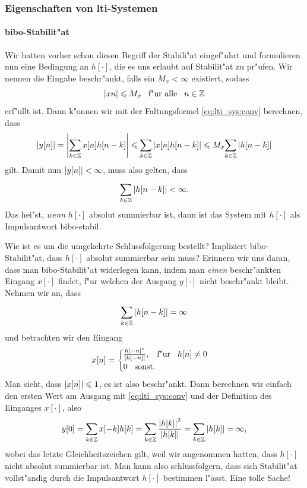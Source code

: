 \subsubsection{Eigenschaften von \texorpdfstring{\acrshort{lti}}{LTI}-Systemen}
%
\paragraph{\texorpdfstring{\gls{bibo}}{BIBO}-Stabilit"at}
Wir hatten vorher schon diesen Begriff der Stabili"at eingef"uhrt und formulieren nun eine Bedingung an $h[\cdot]$, die es uns erlaubt auf Stabilit"at zu pr"ufen.
Wir nennen die Eingabe beschr"ankt, falls ein $M_x < \infty$ existiert, sodass
\[
{\left| x{n} \right|} \leqslant M_x {\hspace{3mm} \text{f"ur alle} \hspace{3mm}} n \in \mathbb{Z}
\]
erf"ullt ist.
Dann k"onnen wir mit der Faltungsformel \eqref{eq:lti_sys:conv} berechnen, dass
\[
{\left| y[n] \right|} 
    = {\left| {\sum\limits_{k\in\mathbb{Z}}^{}{x[n] h[n-k]}} \right|} 
    \leqslant {\sum\limits_{k\in\mathbb{Z}}^{}{{\left| x[n] h[n-k] \right|}}} 
    \leqslant M_x {\sum\limits_{k\in\mathbb{Z}}^{}{{\left| h[n-k] \right|}}} 
\]
gilt.
Damit nun ${\left| y[n] \right|} < \infty$, muss also gelten, dass
\[
    {\sum\limits_{k\in\mathbb{Z}}^{}{{\left| h[n-k] \right|}}} < \infty.
\]
Das hei"st, \emph{wenn} $h[\cdot]$ absolut summierbar ist, dann ist das System mit $h[\cdot]$ als Impulsantwort \gls{bibo}-stabil.

Wie ist es um die umgekehrte Schlussfolgerung bestellt?
Impliziert \gls{bibo}-Stabilit"at, dass $h[\cdot]$ absolut summierbar sein muss?
Erinnern wir uns daran, dass man \gls{bibo}-Stabilit"at widerlegen kann, indem man \emph{einen} beschr"ankten Eingang $x[\cdot]$ findet, f"ur welchen der Ausgang $y[\cdot]$ nicht beschr"ankt bleibt.
Nehmen wir an, dass 
\[
{\sum\limits_{k\in\mathbb{Z}}^{}{{\left| h[n-k] \right|}}} = \infty
\]
und betrachten wir den Eingang
\[
x[n] = \begin{cases}
    \frac{h[-n]^\ast}{{\left| h[-n] \right|}}, {\hspace{3mm} \text{f"ur} \hspace{3mm}} h[n] \neq 0 \\
    0 {\hspace{3mm} \text{sonst.} \hspace{3mm}}
\end{cases}
\]
Man sieht, dass ${\left| x[n] \right|} \leqslant 1$, es ist also beschr"ankt.
Dann berechnen wir einfach den ersten Wert am Ausgang mit \eqref{eq:lti_sys:conv} und der Definition des Einganges $x[\cdot]$, also
\[
y[0] 
    = {\sum\limits_{k\in\mathbb{Z}}^{}{x[-k] h[k]}}
    = {\sum\limits_{k\in\mathbb{Z}}^{}{
        \frac{{\left| h[k] \right|}^2}{{\left| h[k] \right|}}
    }}
    = {\sum\limits_{k\in\mathbb{Z}}^{}{
        {\left| h[k] \right|}
    }}
    = \infty,
\]
wobei das letzte Gleichheitszeichen gilt, weil wir angenommen hatten, dass $h[\cdot]$ nicht absolut summierbar ist.
Man kann also schlussfolgern, dass sich Stabilit"at vollst"andig durch die Impulsantwort $h[\cdot]$ bestimmen l"asst.
Eine tolle Sache!
%

